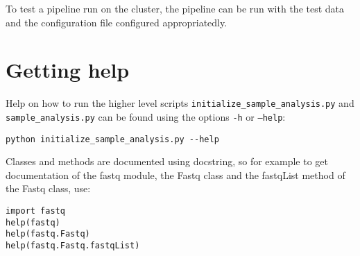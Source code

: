 \documentclass[a4paper]{article}
\begin{document}
To test a pipeline run on the cluster, the pipeline can be run with
the test data and the configuration file configured appropriatedly.
  





\section{Getting help}
\label{sec:getting-help}


Help on how to run the higher level
scripts \texttt{initialize\_sample\_analysis.py} and
\texttt{sample\_analysis.py} can be found using the options
\texttt{-h} or \texttt{--help}:

\begin{verbatim}
python initialize_sample_analysis.py --help
\end{verbatim}

Classes and methods are documented using docstring, so for example to
get documentation of the fastq module, the Fastq class and the
fastqList method of the Fastq class, use:

\begin{verbatim}
import fastq
help(fastq)
help(fastq.Fastq)
help(fastq.Fastq.fastqList)
\end{verbatim}



\printbibliography
\end{document}
